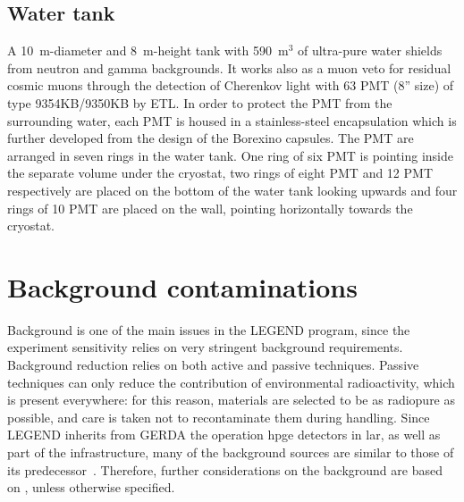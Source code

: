 \subsection{Water tank}
A 10~m-diameter and 8~m-height tank with 590~m$^3$ of ultra-pure water shields from neutron and gamma backgrounds. It works also as a muon veto for residual cosmic muons through the detection of Cherenkov light with 63 \ac{PMT} (8” size) of type 9354KB/9350KB by ETL. In order
to protect the \ac{PMT} from the surrounding water, each PMT is housed in a stainless-steel encapsulation which is further developed from the design of the Borexino capsules. The \ac{PMT} are arranged in seven rings in the water tank. One ring of six \ac{PMT} is pointing inside the separate volume under the cryostat,  two rings of eight \ac{PMT} and 12 \ac{PMT}  respectively are placed on the bottom of the water tank looking upwards and four rings of 10 \ac{PMT} are placed on the wall, pointing horizontally towards the cryostat. \cite{GERDA-muonVeto} 


\section{Background contaminations}
\label{sec:background}
Background is one of the main issues in the LEGEND program, since the experiment sensitivity relies on very stringent background requirements. Background reduction relies on both active and passive techniques. Passive techniques can only reduce the contribution of environmental radioactivity, which is present everywhere: for this reason, materials are selected to be as radiopure as possible, and care is taken not to recontaminate them during handling. Since LEGEND inherits from GERDA the operation \ac{hpge} detectors in \ac{lar}, as well as part of the infrastructure, many of the background sources are similar to those of its predecessor~\cite{L200-sep25}. Therefore, further considerations on the background are based on \cite{GERDAphase2}, unless otherwise specified.


